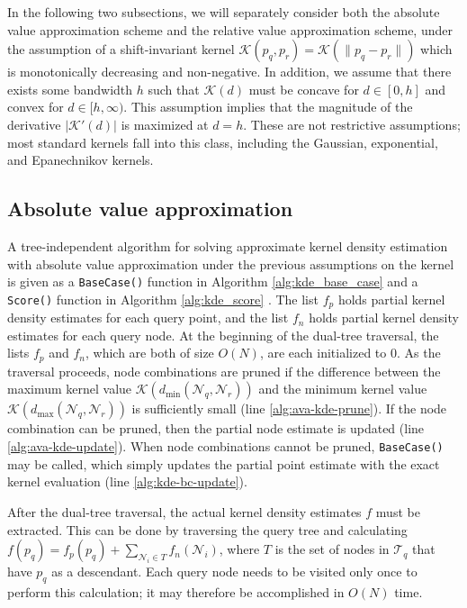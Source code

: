 In the following two subsections, we will separately consider both the absolute
value approximation scheme and the relative value approximation scheme, under
the assumption of a shift-invariant kernel $\mathcal{K}(p_q, p_r) =
\mathcal{K}(\| p_q - p_r \|)$ which is monotonically decreasing and
non-negative.  In addition, we assume that there exists some bandwidth $h$ such
that $\mathcal{K}(d)$ must be concave for $d \in [0, h]$ and convex for $d \in
[h, \infty)$.  This assumption implies that the magnitude of the derivative
$|\mathcal{K}'(d)|$ is maximized at $d = h$.  These are not restrictive
assumptions; most standard kernels fall into this class, including the Gaussian,
exponential, and Epanechnikov kernels.

\subsection{Absolute value approximation}

A tree-independent algorithm for solving approximate kernel density estimation
with absolute value approximation under the previous assumptions on the kernel
is given as a \texttt{BaseCase()} function in Algorithm \ref{alg:kde_base_case}
and a \texttt{Score()} function in Algorithm \ref{alg:kde_score}  \citep[a
correctness proof can be found in][]{curtin2013tree}.  The list $f_p$ holds
partial kernel density estimates for each query point, and the list $f_n$ holds
partial kernel density estimates for each query node.  At the beginning of the
dual-tree traversal, the lists $f_p$ and $f_n$, which are both of size $O(N)$,
are each initialized to 0.  As the traversal proceeds, node combinations are
pruned if the difference between the maximum kernel value
$\mathcal{K}(d_{\min}(\mathscr{N}_q, \mathscr{N}_r))$ and the minimum kernel
value $\mathcal{K}(d_{\max}(\mathscr{N}_q, \mathscr{N}_r))$ is sufficiently
small (line \ref{alg:ava-kde-prune}).  If the node combination can be pruned,
then the partial node estimate is updated (line \ref{alg:ava-kde-update}).  When
node combinations cannot be pruned, \texttt{BaseCase()} may be called, which
simply updates the partial point estimate with the exact kernel evaluation (line
\ref{alg:kde-bc-update}).

After the dual-tree traversal, the actual kernel density estimates $f$
must be extracted.  This can be done by traversing the query tree and
calculating $f(p_q) = f_p(p_q) + \sum_{\mathscr{N}_i \in T}
f_n(\mathscr{N}_i)$, where $T$ is the set of nodes in $\mathscr{T}_q$ that
have $p_q$ as a descendant.  %
Each query node needs to be visited only once to perform this calculation; it
may therefore be accomplished in $O(N)$ time.

